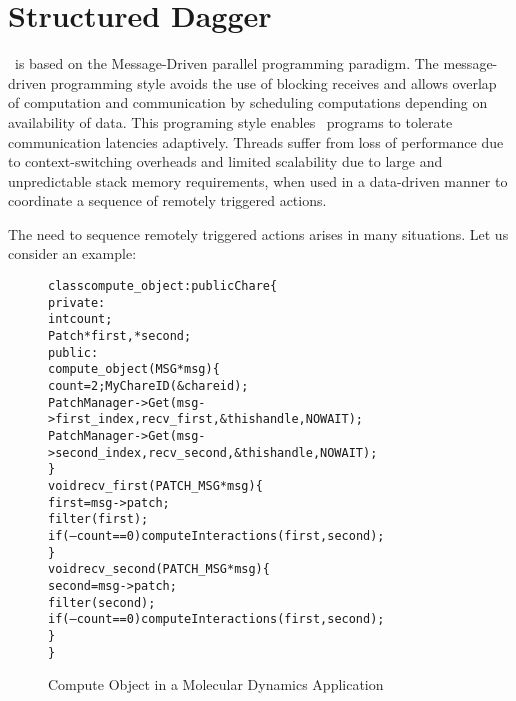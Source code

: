 \section{Structured Dagger}

\charmpp\ is based on the Message-Driven parallel programming paradigm.  The
message-driven programming style avoids the use of blocking receives and
allows overlap of computation and communication by scheduling computations
depending on availability of data.  This programing style enables \charmpp\
programs to tolerate communication latencies adaptively. Threads suffer from
loss of performance due to context-switching overheads and limited scalability
due to large and unpredictable stack memory requirements, when used in a
data-driven manner to coordinate a sequence of remotely triggered actions.

The need to sequence remotely triggered actions
arises in many situations. Let us consider an example:

\begin{figure}[ht]
\begin{center}
\begin{alltt}
      class compute_object : public Chare \{
      private:
      int         count;
      Patch       *first, *second;
      public:
      compute_object(MSG *msg) \{
      count = 2; MyChareID(\&chareid);
      PatchManager->Get(msg->first_index, recv_first, \&thishandle,NOWAIT);
      PatchManager->Get(msg->second_index, recv_second, \&thishandle,NOWAIT);
      \}
      void recv_first(PATCH_MSG *msg) \{
       first = msg->patch;
       filter(first);
       if (--count == 0 ) computeInteractions(first,second);
      \} 
      void recv_second(PATCH_MSG *msg)\{
       second = msg->patch;
       filter(second);
       if (--count == 0) computeInteractions(first,second);
      \}
     \}
\end{alltt}
\end{center}
\caption{Compute Object in a Molecular Dynamics Application}
\label{figchareexample}
\end{figure}


